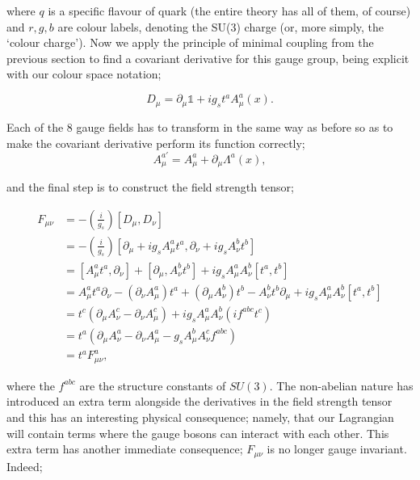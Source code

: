 where $q$ is a specific flavour of quark (the entire theory has all of them, of course) and $r,g,b$ are colour labels, denoting the SU(3) charge (or, more simply, the `colour charge'). Now we apply the principle of minimal coupling from the previous section to find a covariant derivative for this gauge group, being explicit with our colour space notation;

\begin{equation}
D_\mu = \partial_\mu \mathbb{1} + i g_s t^a A^a_\mu(x).
\end{equation}

Each of the 8 gauge fields has to transform in the same way as before so as to make the covariant derivative perform its function correctly;
\begin{equation}
A_\mu^{a'} = A^a_\mu + \partial_\mu \Lambda^a(x),
\end{equation}

and the final step is to construct the field strength tensor;

\begin{equation}
\begin{split}
F_{\mu \nu} &= -\left(\frac{i}{g_s}\right) [D_\mu, D_\nu] \\
& =-\left(\frac{i}{g_s}\right) [\partial_\mu + i g_s A_\mu^a t^a, \partial_\nu + i g_s A_\nu^b t^b] \\
&= [A_\mu^a t^a, \partial_\nu] + [\partial_\mu, A_\nu^b t^b] + i g_s A^a_\mu A_\nu^b[t^a, t^b] \\
&= A^a_\mu t^a \partial_\nu - (\partial_\nu A_\mu^a) t^a + (\partial_\mu A_\nu^b) t^b - A_\nu^b t^b \partial_\mu + i g_s A^a_\mu A_\nu^b [t^a, t^b] \\
&= t^c( \partial_\mu A_\nu^c - \partial_\nu A_\mu^c) + i g_s A_\mu^a A_\nu^b (i f^{abc}t^c) \\
&= t^a( \partial_\mu A_\nu^a - \partial_\nu A_\mu^a - g_s A_\mu^b A_\nu^c f^{abc}) \\
&= t^a F_{\mu \nu}^a,
\end{split}
\end{equation}

where the $f^{abc}$ are the structure constants of $SU(3)$. The non-abelian nature has introduced an extra term alongside the derivatives in the field strength tensor and this has an interesting physical consequence; namely, that our Lagrangian will contain terms where the gauge bosons can interact with each other. This extra term has another immediate consequence; $F_{\mu \nu}$ is no longer gauge invariant. Indeed;

